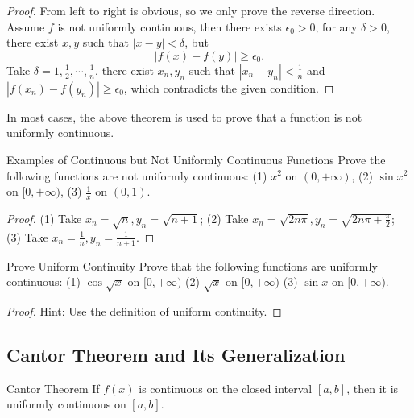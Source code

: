 \begin{proof}
  From left to right is obvious, so we only prove the reverse direction.
  Assume $f$ is not uniformly continuous,
  then there exists $\epsilon_0 > 0$, for any $\delta > 0$,
  there exist $x, y$ such that $|x - y| < \delta$, but
  \begin{equation}
    |f(x) - f(y)| \geq \epsilon_0.
  \end{equation}
  Take $\delta = 1, \frac{1}{2}, \cdots, \frac{1}{n}$, there exist $x_n, y_n$
  such that $|x_n - y_n| < \frac{1}{n}$ and $|f(x_n) - f(y_n)| \geq \epsilon_0$,
  which contradicts the given condition.
\end{proof}

\begin{note}
  In most cases, the above theorem is used to prove that
  a function is not uniformly continuous.
\end{note}

\begin{example}{Examples of Continuous but Not Uniformly Continuous Functions}{}
  Prove the following functions are not uniformly continuous:
  (1) $x^2$ on $(0, +\infty)$,
  (2) $\sin x^2$ on $[0, + \infty)$,
  (3) $\frac{1}{x}$ on $(0, 1)$.
\end{example}

\begin{proof}
  (1) Take $x_n = \sqrt{n}, y_n = \sqrt{n + 1}$;
  (2) Take $x_n = \sqrt{2n \pi}, y_n = \sqrt{2n \pi + \frac{\pi}{2}}$;
  (3) Take $x_n = \frac{1}{n}, y_n = \frac{1}{n+1}$.
\end{proof}

\begin{example}{Prove Uniform Continuity}{}
  Prove that the following functions are uniformly continuous:
  (1) $\cos \sqrt{x}$ on $[0, +\infty)$
  (2) $\sqrt{x}$ on $[0, +\infty)$
  (3) $\sin x$ on $[0, +\infty)$.
\end{example}

\begin{proof}
  Hint: Use the definition of uniform continuity.
\end{proof}

\subsection{Cantor Theorem and Its Generalization}

\begin{theorem}{Cantor Theorem}{}
  If $f(x)$ is continuous on the closed interval $[a, b]$,
  then it is uniformly continuous on $[a, b]$.
\end{theorem}

